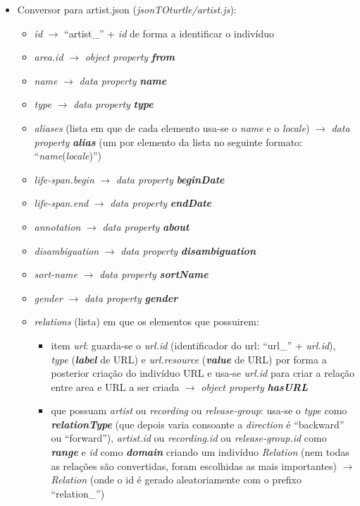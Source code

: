 \documentclass{article}
\begin{document}
\begin{itemize}
\begin{itemize}
\begin{itemize}
                \end{itemize}
        \end{itemize}
    \item Conversor para artist.json (\textit{jsonTOturtle/artist.js}):
        \begin{itemize}
            \item \textit{id} $\to$ ``artist\_'' + \textit{id} de forma a identificar o indivíduo
            \item \textit{area.id} $\to$ \textit{object property} \textit{\textbf{from}}
            \item \textit{name} $\to$ \textit{data property} \textit{\textbf{name}}
            \item \textit{type} $\to$ \textit{data property} \textit{\textbf{type}}
            \item \textit{aliases} (lista em que de cada elemento usa-se o \textit{name} e o \textit{locale}) $\to$ \textit{data property} \textit{\textbf{alias}} (um por elemento da lista no seguinte formato: ``\textit{name}(\textit{locale})'')
            \item \textit{life-span.begin} $\to$ \textit{data property} \textit{\textbf{beginDate}}
            \item \textit{life-span.end} $\to$ \textit{data property} \textit{\textbf{endDate}}
            \item \textit{annotation} $\to$ \textit{data property} \textit{\textbf{about}}
            \item \textit{disambiguation} $\to$ \textit{data property} \textit{\textbf{disambiguation}}
            \item \textit{sort-name} $\to$ \textit{data property} \textit{\textbf{sortName}}
            \item \textit{gender} $\to$ \textit{data property} \textit{\textbf{gender}}
            \item \textit{relations} (lista) em que os elementos que possuirem:
                \begin{itemize}
                    \item item \textit{url}: guarda-se o \textit{url.id} (identificador do url: ``url\_'' + \textit{url.id}), \textit{type} (\textit{\textbf{label}} de URL) e \textit{url.resource} (\textit{\textbf{value}} de URL) por forma a posterior criação do indivíduo URL e usa-se \textit{url.id} para criar a relação entre area e URL a ser criada $\to$ \textit{object property} \textit{\textbf{hasURL}}
                    \item que possuam \textit{artist} ou \textit{recording} ou \textit{release-group}: usa-se o \textit{type} como \textit{\textbf{relationType}} (que depois varia consoante a \textit{direction} é ``backward'' ou ``forward''), \textit{artist.id} ou \textit{recording.id} ou \textit{release-group.id} como \textit{\textbf{range}} e \textit{id} como \textit{\textbf{domain}} criando um indivíduo \textit{Relation} (nem todas as relações são convertidas, foram escolhidas as mais importantes) $\to$ \textit{Relation} (onde o id é gerado aleatoriamente com o prefixo ``relation\_'')

\end{itemize}
\end{itemize}
\end{itemize}
\end{document}
